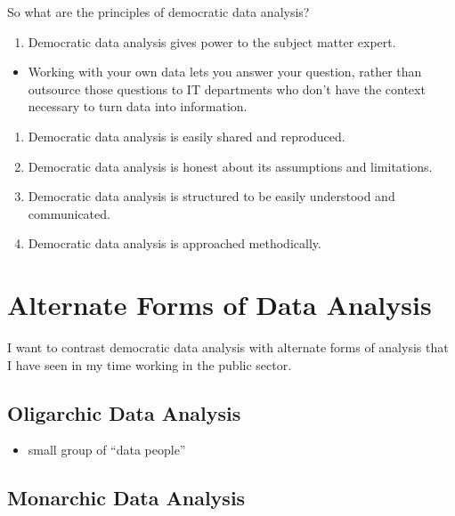 \documentclass[]{book}
\providecommand{\tightlist}{%
  \setlength{\itemsep}{0pt}\setlength{\parskip}{0pt}}
\begin{document}
So what are the principles of democratic data analysis?

\begin{enumerate}
\def\labelenumi{\arabic{enumi}.}
\tightlist
\item
  Democratic data analysis gives power to the subject matter expert.
\end{enumerate}

\begin{itemize}
\tightlist
\item
  Working with your own data lets you answer your question, rather than
  outsource those questions to IT departments who don't have the context
  necessary to turn data into information.
\end{itemize}

\begin{enumerate}
\def\labelenumi{\arabic{enumi}.}
\setcounter{enumi}{1}
\tightlist
\item
  Democratic data analysis is easily shared and reproduced.
\item
  Democratic data analysis is honest about its assumptions and
  limitations.
\item
  Democratic data analysis is structured to be easily understood and
  communicated.
\item
  Democratic data analysis is approached methodically.
\end{enumerate}

\section{Alternate Forms of Data
Analysis}\label{alternate-forms-of-data-analysis}

I want to contrast democratic data analysis with alternate forms of
analysis that I have seen in my time working in the public sector.

\subsection*{Oligarchic Data Analysis}\label{oligarchic-data-analysis}

\begin{itemize}
\tightlist
\item
  small group of ``data people''
\end{itemize}

\subsection*{Monarchic Data Analysis}\label{monarchic-data-analysis}
\end{document}
